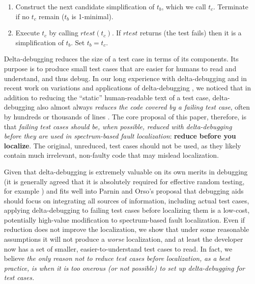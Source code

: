 \begin{enumerate}
\item Construct the next candidate simplification of $t_b$, which
we call $t_c$.  Terminate if no $t_c$ remain ($t_b$ is 1-minimal).
\item Execute $t_c$ by calling $\mathit{rtest}(t_c)$.  If $\mathit{rtest}$ returns  (the test fails) then it is a simplification of $t_b$.  Set $t_b = t_c$.
\end{enumerate}

Delta-debugging reduces the size of a test case in terms of its
components.  Its purpose is to produce small test cases that are
easier for humans to read and understand, and thus debug.  In our long
experience with delta-debugging \cite{ICSEDiff,AMAI} and in recent
work on variations and applications of delta-debugging
\cite{icst2014,issta14,PLDI13}, we noticed that in addition to
reducing the ``static'' human-readable text of a test case,
delta-debugging also almost always \emph{reduces the code covered by a
failing test case}, often by hundreds or thousands of lines
\cite{icst2014}.  The core proposal of this paper, therefore, is that
\emph{failing test cases should be, when possible, reduced with
delta-debugging before they are used in spectrum-based fault
localization}: {\bf reduce before you localize}.  The original,
unreduced, test cases should not be used, as they likely contain much
irrelevant, non-faulty code that may mislead localization.

Given that delta-debugging is extremely valuable on
its own merits in debugging (it is generally agreed that it is
absolutely required for effective random testing, for example
\cite{MinUnit,ICSEDiff,TCminim}) and fits well into Parnin and Orso's
proposal that debugging aids should focus on integrating all sources
of information, including actual test cases, applying delta-debugging
to failing test cases before localizing them is a low-cost,
potentially high-value modification to spectrum-based fault
localization.  Even if reduction does not improve the localization, we
show that under some reasonable assumptions it will not produce a
\emph{worse} localization, and at least the developer now has a set of
smaller, easier-to-understand test cases to read.  In fact, we believe
\emph{the only reason not to reduce test cases before localization, as a
best practice, is when it is too onerous (or not possible) to set up
delta-debugging for test cases.}


